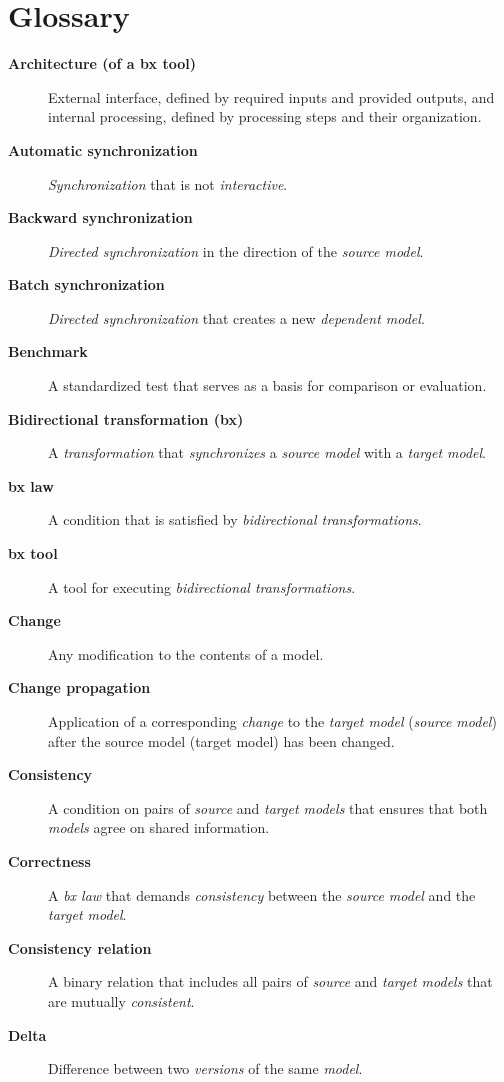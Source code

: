 
\appendix

\section{Glossary}
\label{sec:Glossary}

\begin{description}
	\item[\textbf{Architecture (of a bx tool)}] External interface, defined by required inputs and provided outputs, and internal processing, defined by processing steps and their organization.
	\item[\textbf{Automatic synchronization}] \emph{Synchronization} that is not \emph{interactive}.
	\item[\textbf{Backward synchronization}] \emph{Directed synchronization} in the direction of the \emph{source model}.
	\item[\textbf{Batch synchronization}] \emph{Directed synchronization} that creates a new \emph{dependent model}.
	\item[\textbf{Benchmark}] A standardized test that serves as a basis for comparison or evaluation.
	\item[\textbf{Bidirectional transformation (bx)}] A \emph{transformation} that \emph{synchronizes} a \emph{source model} with a \emph{target model}.
	\item[\textbf{bx law}] A condition that is satisfied by \emph{bidirectional transformations}.
	\item[\textbf{bx tool}] A tool for executing \emph{bidirectional transformations}.
	\item[\textbf{Change}] Any modification to the contents of a model.
	\item[\textbf{Change propagation}] Application of a corresponding \emph{change} to the \emph{target model} (\emph{source model}) after the source model (target model) has been changed.
	\item[\textbf{Consistency}] A condition on pairs of \emph{source} and \emph{target models} that ensures that both \emph{models} agree on shared information.
	\item[\textbf{Correctness}] A \emph{bx law} that demands \emph{consistency} between the \emph{source model} and the \emph{target model}. 
	\item[\textbf{Consistency relation}] A binary relation that includes all pairs of \emph{source} and \emph{target models} that are mutually \emph{consistent}.
	\item[\textbf{Delta}] Difference between two \emph{versions} of the same \emph{model}.

\end{description}
